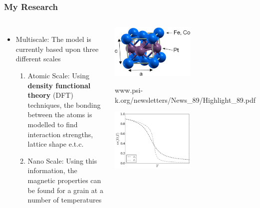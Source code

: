 \documentclass{beamer}
\begin{document}
\begin{frame}
	\frametitle{My Research}
	\begin{columns}
		\column{6cm}
		\begin{itemize}
			\item{Multiscale: The model is currently based upon three different scales}\newline
			\begin{enumerate}
				\item{Atomic Scale: Using \textbf{density functional theory} (DFT) techniques, the bonding between the atoms is modelled to find interaction strengths, lattice shape e.t.c.}\newline
				\item{Nano Scale: Using this information, the magnetic properties can be found for a grain at a number of temperatures}
			\end{enumerate}
		\end{itemize}
		\column{6cm}
		\begin{center}
			\includegraphics[width=4cm]{lattice}\vspace{1mm}
			
			\tiny www.psi-k.org/newsletters/News{\_}89/Highlight{\_}89.pdf
		
			\includegraphics[width=4cm]{Ds_noinset}
		\end{center}
	\end{columns}
\end{frame}
\end{document}
